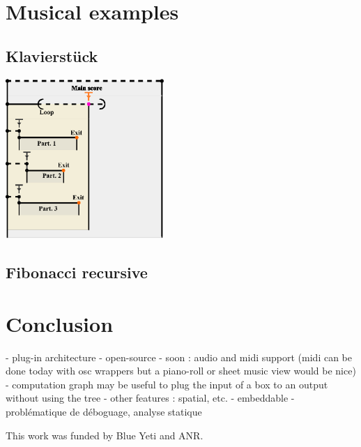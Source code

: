 \documentclass{article}
\begin{document}

\section{Musical examples}\label{sec:typeset_text}

\subsection{Klavierstück}\label{subsec:body}
\includegraphics[width=0.45\textwidth]{images/partition.eps}

\subsection{Fibonacci recursive}

\section{Conclusion}
- plug-in architecture
- open-source
- soon : audio and midi support (midi can be done today with osc wrappers
but a piano-roll or sheet music view would be nice)
- computation graph may be useful to plug the input of a box 
to an output without using the tree
- other features : spatial, etc.
- embeddable 
- problématique de déboguage, analyse statique
\begin{acknowledgments}
    This work was funded by Blue Yeti and ANR.
\end{acknowledgments} 


\end{document}
